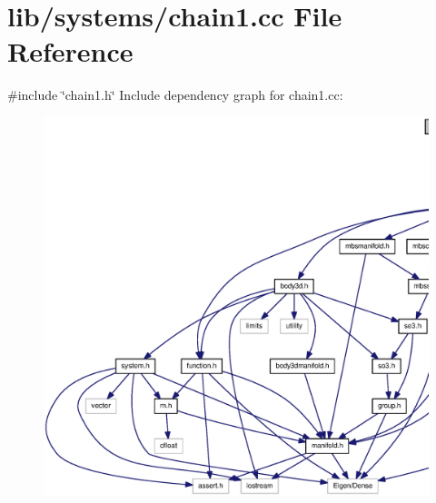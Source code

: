 \section{lib/systems/chain1.cc \-File \-Reference}
\label{chain1_8cc}
{\ttfamily \#include \char`\"{}chain1.\-h\char`\"{}}\*
\-Include dependency graph for chain1.\-cc\-:\nopagebreak
\begin{figure}[H]
\begin{center}
\leavevmode
\includegraphics[width=350pt]{chain1_8cc__incl}
\end{center}
\end{figure}
